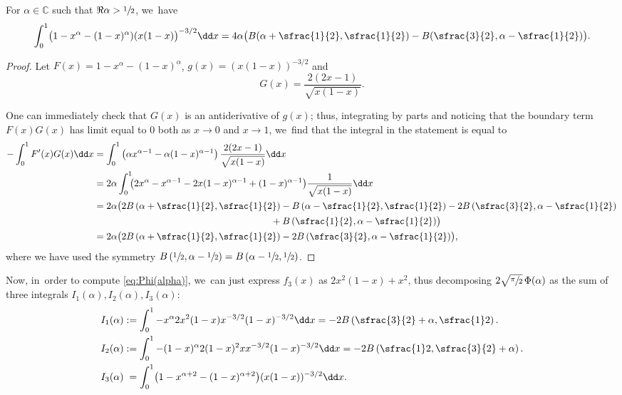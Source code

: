 \begin{lem}\label{lemma:MysteriousPiece}
For $\alpha\in\mathbb{C}$ such that $\Re \alpha > \sfrac{1}{2}$, we~have
\[
\int_0^1 \bigl(1-x^\alpha-(1-x)^\alpha) (x(1-x)\bigr)^{-3/2} \dd x = 4\alpha \bigl(B(\alpha+\sfrac{1}{2}, \sfrac{1}{2}) -B(\sfrac{3}{2}, \alpha-\sfrac{1}{2}) \bigr).
\]
\end{lem}
\begin{proof}
Let $F(x)=1-x^\alpha-(1-x)^\alpha$, $g(x)=(x(1-x))^{-3/2}$ and
\[
G(x) = \frac{2(2x-1)}{\sqrt{x(1-x)}}.
\]

One can immediately check that $G(x)$ is an antiderivative of $g(x)$;
thus, integrating by parts and noticing that the boundary term $F(x)G(x)$ has limit equal to $0$ both as $x \to 0$ and $x \to 1$, we~find that the integral in the statement is equal to
\[
\begin{aligned}
-\int_0^1 F'(x) G(x) \dd x  &=
\int_0^1 \left(\alpha x^{\alpha-1}-\alpha (1-x)^{\alpha-1}\right) \frac{2(2x-1)}{\sqrt{x(1-x)}} \dd x \\
& = 2\alpha \int_0^1 \hspace*{-1mm}\bigl(2x^{\alpha} -x^{\alpha-1}-2x(1-x)^{\alpha-1} + (1-x)^{\alpha-1} \bigr) \frac{1}{\sqrt{x(1-x)}} \dd x \\
& = 2\alpha \bigl(2B\left(\alpha+\sfrac{1}{2}, \sfrac{1}{2}\right) - B\left(\alpha-\sfrac{1}{2}, \sfrac{1}{2}\right) -2B\left(\sfrac{3}{2}, \alpha-\sfrac{1}{2}\right)\\
&\hspace*{6.6cm}+B\left(\sfrac{1}{2},\alpha-\sfrac{1}{2}\right) \bigr) \\
& = 2\alpha \bigl(2B\left(\alpha+\sfrac{1}{2}, \sfrac{1}{2}\right) -2B\left(\sfrac{3}{2}, \alpha-\sfrac{1}{2}\right) \bigr),
\end{aligned}
\]
where we have used the symmetry $B\left(\sfrac{1}{2},\alpha-\sfrac{1}{2}\right)=B\left(\alpha-\sfrac{1}{2}, \sfrac{1}{2}\right)$.
\end{proof}
Now, in~order to compute \eqref{eq:Phi(alpha)}, we~can just express $f_3(x)$ as $2x^2(1-x) + x^2$, thus decomposing $2\sqrt{\sfrac{\pi}{2}}\,\Phi(\alpha)$ as the sum of three integrals $I_1(\alpha), I_2(\alpha), I_3(\alpha)$:
\begin{align*}
I_1(\alpha) &:= \int_0^1 -x^{\alpha} 2x^2 (1-x) x^{-3/2}(1-x)^{-3/2} \dd x = -2B\left(\sfrac{3}{2}+\alpha, \sfrac{1}2\right).
\\
I_2(\alpha) &:= \int_0^1 -(1-x)^{\alpha} 2(1-x)^2 x x^{-3/2}(1-x)^{-3/2} \dd x = -2B\left(\sfrac{1}2, \sfrac{3}{2}+\alpha\right).
\\
I_3(\alpha) &\hphantom{:}= \int_0^1 \bigl(1-x^{\alpha+2}-(1-x)^{\alpha+2}\bigr) (x(1-x))^{-3/2} \dd x.
\end{align*}
